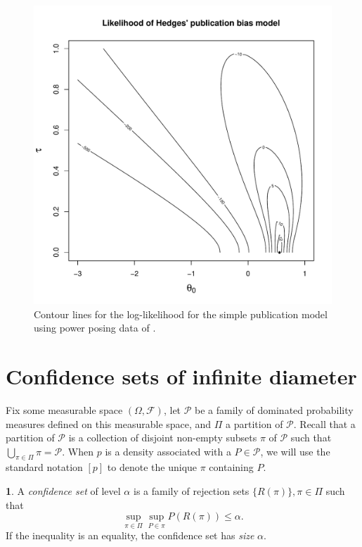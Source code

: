 \documentclass[article]{ajs}
\numberwithin{equation}{section}
\numberwithin{figure}{section}
\theoremstyle{plain}
\theoremstyle{definition}
\newtheorem{defn}[thm]{\protect\definitionname}
\theoremstyle{definition}
\theoremstyle{plain}
\providecommand{\definitionname}{Definition}
\begin{document}
\begin{figure}
\noindent \begin{centering}
\includegraphics[scale=0.5]{chunks/cuddy}
\par\end{centering}
\caption{\label{fig:contour lines}Contour lines for the log-likelihood for
the simple publication model using power posing data of \citet{Cuddy2018-kp}. }

\end{figure}


\section{Confidence sets of infinite diameter}

Fix some measurable space $(\Omega,\mathcal{F})$, let $\mathcal{P}$
be a family of dominated probability measures defined on this measurable
space, and $\Pi$ a partition of $\mathcal{P}$. Recall that a partition
of $\mathcal{P}$ is a collection of disjoint non-empty subsets $\pi$
of $\mathcal{P}$ such that $\bigcup_{\pi\in\Pi}\pi=\mathcal{P}$.
When $p$ is a density associated with a $P\in\mathcal{P}$, we will
use the standard notation $[p]$ to denote the unique $\pi$ containing
$P$. 
\begin{defn}
\label{def:confidence set} A \emph{confidence set} of level $\alpha$
is a family of rejection sets $\{R(\pi)\},\pi\in\Pi$ such that
\[
\sup_{\pi\in\Pi}\sup_{P\in\pi}P(R(\pi))\leq\alpha.
\]
If the inequality is an equality, the confidence set has \emph{size}
$\alpha$. 
\end{defn}
\end{document}
